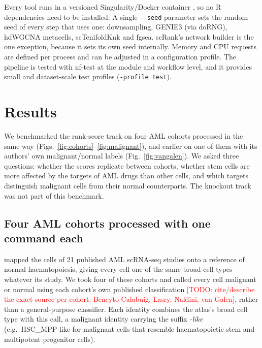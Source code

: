 \documentclass[pdflatex,sn-vancouver-num]{sn-jnl}%
\newcommand{\todo}[1]{\textcolor{red}{[TODO: #1]}}
\newcommand{\param}[1]{\texttt{-{}-#1}}
\begin{document}
Every tool runs in a versioned Singularity/Docker container \citep{Kurtzer2017singularity}, so no R dependencies need to be installed. A single \param{seed} parameter sets the random seed of every step that uses one: downsampling, GENIE3 (via doRNG), hdWGCNA metacells, scTenifoldKnk and fgsea. scRank's network builder is the one exception, because it sets its own seed internally. Memory and CPU requests are defined per process and can be adjusted in a configuration profile. The pipeline is tested with nf-test at the module and workflow level, and it provides small and dataset-scale test profiles (\texttt{-profile test}).

\section{Results}\label{sec:results}

We benchmarked the rank-score track on four AML cohorts processed in the same way (Figs.~\ref{fig:cohorts}--\ref{fig:malignant}), and earlier on one of them with its authors' own malignant/normal labels (Fig.~\ref{fig:vangalen}). We asked three questions: whether the scores replicate between cohorts, whether stem cells are more affected by the targets of AML drugs than other cells, and which targets distinguish malignant cells from their normal counterparts. The knockout track was not part of this benchmark.

\subsection{Four AML cohorts processed with one command each}

\citet{Zeng2025bonemarrowmap} mapped the cells of 21 published AML scRNA-seq studies onto a reference of normal haematopoiesis, giving every cell one of the same broad cell types whatever its study. We took four of these cohorts \citep{BeneytoCalabuig2023aml,Lasry2023aml,Naldini2023aml,vanGalen2019aml} and called every cell malignant or normal using each cohort's own published classification \todo{cite/describe the exact source per cohort: Beneyto-Calabuig, Lasry, Naldini, van Galen}, rather than a general-purpose classifier. Each identity combines the atlas's broad cell type with this call, a malignant identity carrying the suffix \emph{-like} (e.g.\ HSC\_MPP-like for malignant cells that resemble haematopoietic stem and multipotent progenitor cells).
\end{document}
